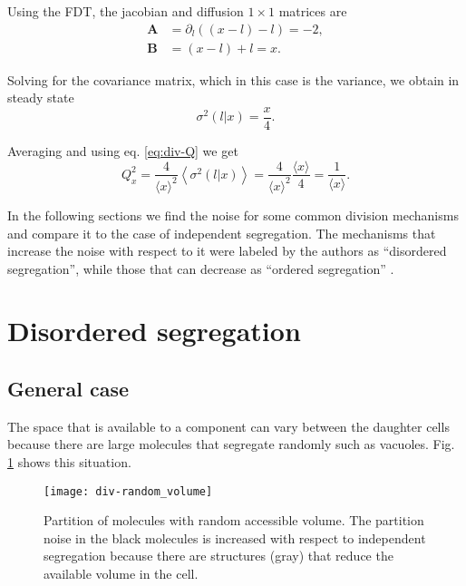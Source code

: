 Using the FDT, the jacobian and diffusion $1\times1$ matrices are
\begin{equation*}
  \begin{split}
    \mathbf{A} &= \partial_l\left((x-l)-l\right) = -2,\\
    \mathbf{B} &= (x-l)+l = x.
  \end{split}
\end{equation*}

Solving for the covariance matrix, which in this case is the variance, we obtain in steady state
\begin{equation}
  \label{eq:div-var_ind}
  \sigma^2(l|x) = \frac{x}{4}.
\end{equation}

Averaging and using eq. \eqref{eq:div-Q} we get
\begin{equation}
  \label{div-Rindep}
  Q_x^2 = \frac{4}{\langle x\rangle^2}\left\langle\sigma^2(l|x)\right\rangle = \frac{4}{\langle x\rangle^2}\frac{\langle x\rangle}{4} = \frac{1}{\langle x\rangle}.
\end{equation}

In the following sections we find the noise for some common division mechanisms and compare it to the case of independent segregation. The mechanisms that increase the noise with respect to it were labeled by the authors as ``disordered segregation'', while those that can decrease as ``ordered segregation'' \cite{huh11b}.

\section{Disordered segregation}

\subsection{General case}

The space that is available to a component can vary between the daughter cells because there are large molecules that segregate randomly such as vacuoles. Fig. \ref{fig:div-random_volume} shows this situation.
\begin{figure}[H]
  \centering
  \texttt{[image: div-random\_volume]}
  \caption[Partition of molecules with random accessible volume]{\label{fig:div-random_volume}Partition of molecules with random accessible volume. The partition noise in the black molecules is increased with respect to independent segregation because there are structures (gray) that reduce the available volume in the cell.}
\end{figure}

